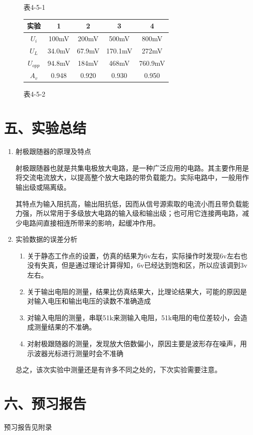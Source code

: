 \documentclass[a4paper,10pt,notitlepage]{article}
\begin{document}
\begin{enumerate}
\begin{figure}[h]
\begin{minipage}{0.3\textwidth}
\begin{tabular}{|c|c|c|c|c|}
				\hline
			\end{tabular}
			\caption*{表4-5-1}
		\end{minipage}
		\hspace{4cm}
		\begin{minipage}{0.3\textwidth}
			\begin{tabular}{|c|c|c|c|c|}
				\hline
				实验 & 1 & 2 & 3 & 4 \\
				\hline
				$U_i$ & 100mV & 200mV & 500mV & 800mV  \\
				\hline
				$U_L$ & 34.0mV & 67.9mV & 170.1mV & 272mV \\
				\hline
				$U_{opp}$ & 94.8mV & 184mV & 468mV & 760.9mV \\
				\hline
				$A_v$ & 0.948 & 0.920 & 0.930 & 0.950 \\
				\hline
			\end{tabular}
			\caption*{表4-5-2}
		\end{minipage}
	\end{figure}
\end{enumerate}
\section*{五、实验总结}
\begin{enumerate}
	\item 射极跟随器的原理及特点 \par 
	\qquad 射极跟随器也就是共集电极放大电路，是一种广泛应用的电路。其主要作用是将交流电流放大，以提高整个放大电路的带负载能力。实际电路中，一般用作输出级或隔离级。\par 
	\qquad 其特点为输入阻抗高，输出阻抗低，因而从信号源索取的电流小而且带负载能力强，所以常用于多级放大电路的输入级和输出级；也可用它连接两电路，减少电路间直接相连所带来的影响，起缓冲作用。\par 
	\item  实验数据的误差分析
	\begin{enumerate}
		\item 关于静态工作点的设置，仿真的结果为6v左右，实际操作时发现6v左右也没有失真，但是通过理论计算得知，6v已经达到饱和区，所以应该调到3v左右。
		\item 关于输出电阻的测量，结果比仿真结果大，比理论结果大，可能的原因是对输入电压和输出电压的读数不准确造成
		\item 对输入电阻的测量，串联51k来测输入电阻，51k电阻的电位差较小，会造成测量结果的不准确。
		\item 对射极跟随器的测量，发现放大倍数偏小，原因主要是波形存在噪声，用示波器光标进行测量时会不准确
	\end{enumerate}
	总之，该次实验中测量还是有许多不同之处的，下次实验需要注意。
\end{enumerate}
\section*{六、预习报告}
预习报告见附录
\end{document}
